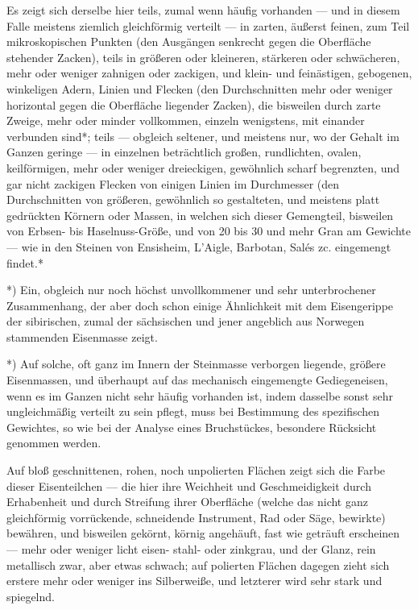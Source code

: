 \documentclass[a4paper, 11pt, oneside, german]{article}
\begin{document}
Es zeigt sich derselbe hier teils, zumal wenn häufig vorhanden --- und in diesem Falle meistens ziemlich gleichförmig verteilt --- in zarten, äußerst feinen, zum Teil mikroskopischen Punkten (den Ausgängen senkrecht gegen die Oberfläche stehender Zacken), teils in größeren oder kleineren, stärkeren oder schwächeren, mehr oder weniger zahnigen oder zackigen, und klein- und feinästigen, gebogenen, winkeligen Adern, Linien und Flecken (den Durchschnitten mehr oder weniger horizontal gegen die Oberfläche liegender Zacken), die bisweilen durch zarte Zweige, mehr oder minder vollkommen, einzeln wenigstens, mit einander verbunden sind*; teils --- obgleich seltener, und meistens nur, wo der Gehalt im Ganzen geringe --- in einzelnen beträchtlich großen, rundlichten, ovalen, keilförmigen, mehr oder weniger dreieckigen, gewöhnlich scharf begrenzten, und gar nicht zackigen Flecken von einigen Linien im Durchmesser (den Durchschnitten von größeren, gewöhnlich so gestalteten, und meistens platt gedrückten Körnern oder Massen, in welchen sich dieser Gemengteil, bisweilen von Erbsen- bis Haselnuss-Größe, und von 20 bis 30 und mehr Gran am Gewichte --- wie in den Steinen von Ensisheim, L'Aigle, Barbotan, Salés zc. eingemengt findet.*

*) Ein, obgleich nur noch höchst unvollkommener und sehr unterbrochener Zusammenhang, der aber doch schon einige Ähnlichkeit mit dem Eisengerippe der sibirischen, zumal der sächsischen und jener angeblich aus Norwegen stammenden Eisenmasse zeigt.

*) Auf solche, oft ganz im Innern der Steinmasse verborgen liegende, größere Eisenmassen, und überhaupt auf das mechanisch eingemengte Gediegeneisen, wenn es im Ganzen nicht sehr häufig vorhanden ist, indem dasselbe sonst sehr ungleichmäßig verteilt zu sein pflegt, muss bei Bestimmung des spezifischen Gewichtes, so wie bei der Analyse eines Bruchstückes, besondere Rücksicht genommen werden.

Auf bloß geschnittenen, rohen, noch unpolierten Flächen zeigt sich die Farbe dieser Eisenteilchen --- die hier ihre Weichheit und Geschmeidigkeit durch Erhabenheit und durch Streifung ihrer Oberfläche (welche das nicht ganz gleichförmig vorrückende, schneidende Instrument, Rad oder Säge, bewirkte) bewähren, und bisweilen gekörnt, körnig angehäuft, fast wie geträuft erscheinen --- mehr oder weniger licht eisen- stahl- oder zinkgrau, und der Glanz, rein metallisch zwar, aber etwas schwach; auf polierten Flächen dagegen zieht sich erstere mehr oder weniger ins Silberweiße, und letzterer wird sehr stark und spiegelnd.
\end{document}
